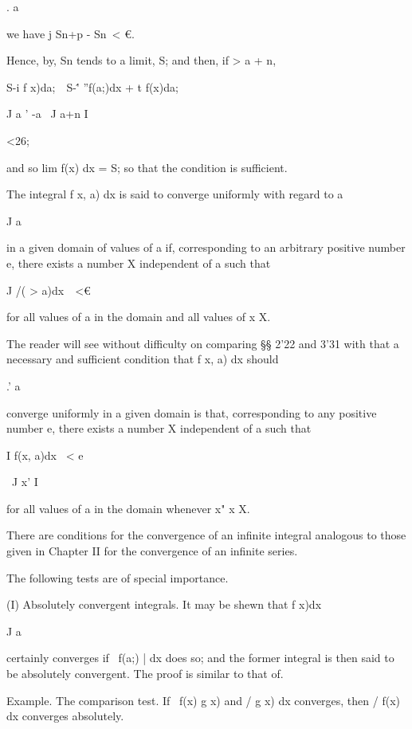 . a

we have j Sn+p - Sn\ < €.

Hence, by, Sn tends to a limit, S; and then, if > a + n,

S-i f x)da;\ \ S-\'' ''f(a;)dx + t f(x)da;\

J a ' -a \ J a+n I

<26;

and so lim f(x) dx = S; so that the condition is sufficient.


The integral f x, a) dx is said to converge uniformly with regard to a

J a

in a given domain of values of a if, corresponding to an arbitrary
positive number e, there exists a number X independent of a such that

J /( > a)dx\ \ <€

for all values of a in the domain and all values of x X.

The reader will see without difficulty on comparing §§ 2'22 and 3'31
with that a necessary and sufficient condition that f x, a) dx
should

.' a

converge uniformly in a given domain is that, corresponding to any
positive number e, there exists a number X independent of a such that

I f(x, a)dx \ < e

\ J x' I

for all values of a in the domain whenever x" x X.


There are conditions for the convergence of an infinite integral
analogous to those given in Chapter II for the convergence of an
infinite series.

The following tests are of special importance.

%
%

(I) Absolutely convergent integrals. It may be shewn that f x)dx

J a

certainly converges if \ f(a;) | dx does so; and the former integral
is then said to be absolutely convergent. The proof is similar to that
of.

Example. The comparison test. If \ f(x) g x) and / g x) dx converges,
then / f(x) dx converges absolutely.

